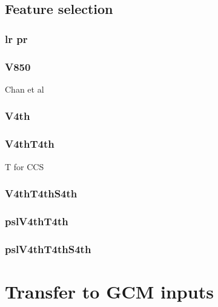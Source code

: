 \subsection{Feature selection}

\subsubsection{lr pr}

\subsubsection{V850}

Chan et al

\subsubsection{V4th}

\subsubsection{V4thT4th}

T for CCS

\subsubsection{V4thT4thS4th}

\subsubsection{pslV4thT4th}

\subsubsection{pslV4thT4thS4th}

\section{Transfer to GCM inputs}